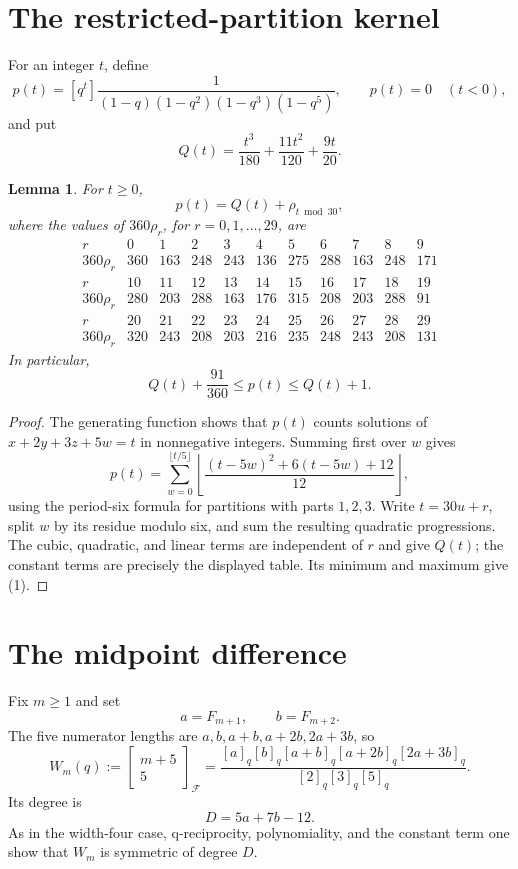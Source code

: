 \documentclass[11pt]{article}
\newtheorem{lemma}[theorem]{Lemma}
\newcommand{\qfib}[2]{\left[\!\begin{matrix}#1\\#2\end{matrix}\!\right]_{\!\mathcal F}}
\begin{document}
\section{The restricted-partition kernel}

For an integer \(t\), define
\[
 p(t)=[q^t]\frac{1}{(1-q)(1-q^2)(1-q^3)(1-q^5)},
 \qquad p(t)=0\quad(t<0),
\]
and put
\[
 Q(t)=\frac{t^3}{180}+\frac{11t^2}{120}+\frac{9t}{20}.
\]

\begin{lemma}\label{lem:kernel}
For \(t\geq0\),
\[
 p(t)=Q(t)+\rho_{t\bmod30},
\]
where the values of \(360\rho_r\), for \(r=0,1,\ldots,29\), are
\[
\begin{array}{c|rrrrrrrrrr}
r&0&1&2&3&4&5&6&7&8&9\\ \hline
360\rho_r&360&163&248&243&136&275&288&163&248&171\\[2pt]
r&10&11&12&13&14&15&16&17&18&19\\ \hline
360\rho_r&280&203&288&163&176&315&208&203&288&91\\[2pt]
r&20&21&22&23&24&25&26&27&28&29\\ \hline
360\rho_r&320&243&208&203&216&235&248&243&208&131
\end{array}
\]
In particular,
\[
 Q(t)+\frac{91}{360}\leq p(t)\leq Q(t)+1. \tag{1}
\]
\end{lemma}

\begin{proof}
The generating function shows that \(p(t)\) counts solutions of
\(x+2y+3z+5w=t\) in nonnegative integers.  Summing first over \(w\) gives
\[
 p(t)=\sum_{w=0}^{\lfloor t/5\rfloor}
 \left\lfloor\frac{(t-5w)^2+6(t-5w)+12}{12}\right\rfloor,
\]
using the period-six formula for partitions with parts \(1,2,3\).
Write \(t=30u+r\), split \(w\) by its residue modulo six, and sum the
resulting quadratic progressions.  The cubic, quadratic, and linear terms
are independent of \(r\) and give \(Q(t)\); the constant terms are precisely
the displayed table.  Its minimum and maximum give (1).
\end{proof}

\section{The midpoint difference}

Fix \(m\geq1\) and set
\[
 a=F_{m+1},\qquad b=F_{m+2}.
\]
The five numerator lengths are
\(a,b,a+b,a+2b,2a+3b\), so
\[
 W_m(q):=\qfib{m+5}{5}
 =\frac{[a]_q[b]_q[a+b]_q[a+2b]_q[2a+3b]_q}
 {[2]_q[3]_q[5]_q}. \tag{2}
\]
Its degree is
\[
 D=5a+7b-12. \tag{3}
\]
As in the width-four case, q-reciprocity, polynomiality, and the constant
term one show that \(W_m\) is symmetric of degree \(D\).
\end{document}
